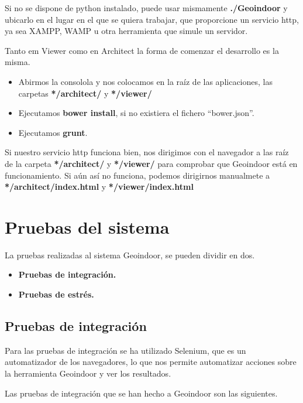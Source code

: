 Si no se dispone de python instalado, puede usar mismamente \textbf{./Geoindoor} y ubicarlo en el lugar en el que se quiera trabajar, que proporcione un servicio http, ya sea XAMPP, WAMP u otra herramienta que simule un servidor.

Tanto em Viewer como en Architect la forma de comenzar el desarrollo es la misma.

\begin{itemize}
	\item Abirmos la consolola y nos colocamos en la raíz de las aplicaciones, las carpetas \textbf{*/architect/} y \textbf{*/viewer/}
	\item Ejecutamos \textbf{bower install}, si no existiera el fichero ``bower.json''.
	\item Ejecutamos \textbf{grunt}.
\end{itemize}

Si nuestro servicio http funciona bien, nos dirigimos con el navegador a las raíz de la carpeta \textbf{*/architect/} y \textbf{*/viewer/} para comprobar que Geoindoor está en funcionamiento.
Si aún así no funciona, podemos dirigirnos manualmete a \textbf{*/architect/index.html} y \textbf{*/viewer/index.html} 


\section{Pruebas del sistema}

La pruebas realizadas al sistema Geoindoor, se pueden dividir en dos.

\begin{itemize}
	\item \textbf{Pruebas de integración.}
	\item \textbf{Pruebas de estrés.}
\end{itemize} 

\subsection{Pruebas de integración}

Para las pruebas de integración se ha utilizado Selenium, que es un automatizador de los navegadores, lo que nos permite automatizar acciones sobre la herramienta Geoindoor y ver los resultados.

Las pruebas de integración que se han hecho a Geoindoor son las siguientes.

